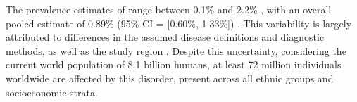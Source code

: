 The prevalence estimates of \cfs range between 0.1\% and 2.2\% \citep{estevez-lopez2020SystematicReviewa}, with an overall pooled estimate of 0.89\% (95\% CI = [0.60\%, 1.33\%]) \citep{lim2020SystematicReviewa}.
% 
% 
This variability is largely attributed to differences in the assumed disease definitions and diagnostic methods, as well as the study region \citep{vincent2012PrevalenceIncidence, nacul2011PrevalenceMyalgic, valdez2018EstimatingPrevalence, slomko2019PrevalenceCharacteristics}.
Despite this uncertainty, considering the current world population of 8.1 billion humans, at least 72 million individuals worldwide are affected by this %
disorder, present across all ethnic groups and socioeconomic strata.

